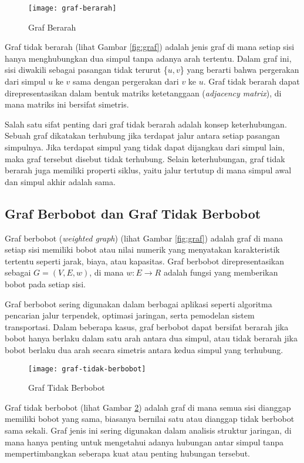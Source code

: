 \begin{figure}[H] 
    \centering  
    \texttt{[image: graf-berarah]}  
    \caption{Graf Berarah}
    \label{fig:grafberarah} 
\end{figure}

Graf tidak berarah (lihat Gambar \ref{fig:graf}) adalah jenis graf di mana setiap sisi hanya menghubungkan dua simpul tanpa adanya arah tertentu. Dalam graf ini, sisi diwakili sebagai pasangan tidak terurut \{$u,v$\} yang berarti bahwa pergerakan dari simpul $u$ ke $v$ sama dengan pergerakan dari $v$ ke $u$. Graf tidak berarah dapat direpresentasikan dalam bentuk matriks ketetanggaan (\textit{adjacency matrix}), di mana matriks ini bersifat simetris.

Salah satu sifat penting dari graf tidak berarah adalah konsep keterhubungan. Sebuah graf dikatakan terhubung jika terdapat jalur antara setiap pasangan simpulnya. Jika terdapat simpul yang tidak dapat dijangkau dari simpul lain, maka graf tersebut disebut tidak terhubung. Selain keterhubungan, graf tidak berarah juga memiliki properti siklus, yaitu jalur tertutup di mana simpul awal dan simpul akhir adalah sama.

\subsection{Graf Berbobot dan Graf Tidak Berbobot ~\cite{Diestel:17:graph}}
\label{sec:grafberbobot}
Graf berbobot (\textit{weighted graph}) (lihat Gambar \ref{fig:graf}) adalah graf di mana setiap sisi memiliki bobot atau nilai numerik yang menyatakan karakteristik tertentu seperti jarak, biaya, atau kapasitas. Graf berbobot direpresentasikan sebagai $G = (V,E,w)$, di mana $w:E\rightarrow R$ adalah fungsi yang memberikan bobot pada setiap sisi.

Graf berbobot sering digunakan dalam berbagai aplikasi seperti  algoritma pencarian jalur terpendek, optimasi jaringan, serta pemodelan sistem transportasi. Dalam beberapa kasus, graf berbobot dapat bersifat berarah jika bobot hanya berlaku dalam satu arah antara dua simpul, atau tidak berarah jika bobot berlaku dua arah secara simetris antara kedua simpul yang terhubung.
\newpage
\begin{figure}[H] 
    \centering  
    \texttt{[image: graf-tidak-berbobot]}  
    \caption{Graf Tidak Berbobot}
    \label{fig:graftidakberbobot} 
\end{figure}
Graf tidak berbobot (lihat Gambar \ref{fig:graftidakberbobot}) adalah graf di mana semua sisi dianggap memiliki bobot yang sama, biasanya bernilai satu atau dianggap tidak berbobot sama sekali. Graf jenis ini sering digunakan dalam analisis struktur jaringan, di mana hanya penting untuk mengetahui adanya hubungan antar simpul tanpa mempertimbangkan seberapa kuat atau penting hubungan tersebut.

